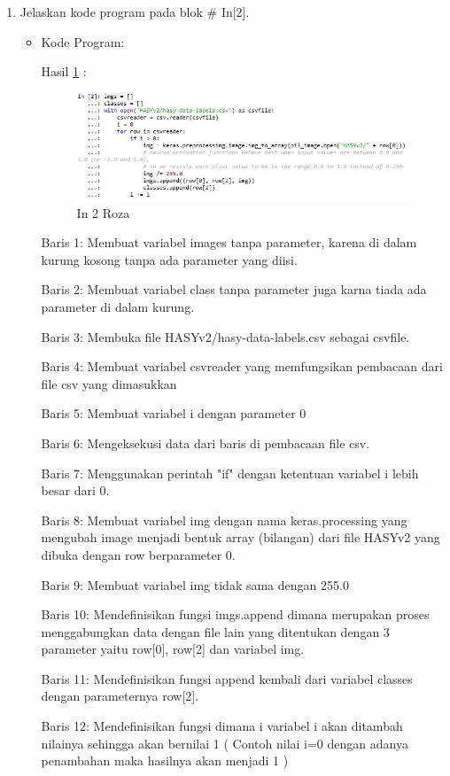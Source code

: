 \begin{enumerate}
\item Jelaskan kode program pada blok \# In[2].
\begin{itemize}
\item Kode Program:

\par Hasil \ref{in2roza} :
\begin{figure}[!hbtp]
\centering
\includegraphics[scale=0.7]{figures/prak2roza.jpg}
\caption{In 2 Roza}
\label{in2roza}
\end{figure}
\par Baris 1: Membuat variabel images tanpa parameter, karena di dalam kurung kosong tanpa ada parameter yang diisi.
\par Baris 2: Membuat variabel class tanpa parameter juga karna tiada ada parameter di dalam kurung.
\par Baris 3: Membuka file HASYv2/hasy-data-labels.csv sebagai csvfile.
\par Baris 4: Membuat variabel csvreader yang memfungsikan pembacaan dari file csv yang dimasukkan
\par Baris 5: Membuat variabel i dengan parameter 0
\par Baris 6: Mengeksekusi data dari baris di pembacaan file csv.
\par Baris 7: Menggunakan perintah "if" dengan ketentuan variabel i lebih besar dari  0.
\par Baris 8: Membuat variabel img dengan nama keras.processing yang mengubah image menjadi bentuk array (bilangan) dari file HASYv2 yang dibuka dengan row berparameter 0.
\par Baris 9: Membuat variabel img tidak sama dengan 255.0
\par Baris 10: Mendefinisikan fungsi imgs.append dimana merupakan proses menggabungkan data dengan file lain  yang ditentukan dengan 3 parameter yaitu row[0], row[2] dan variabel img.
\par Baris 11: Mendefinisikan fungsi append kembali dari variabel classes dengan parameternya row[2].
\par Baris 12: Mendefinisikan fungsi dimana i variabel i akan ditambah nilainya sehingga akan bernilai 1 ( Contoh nilai i=0 dengan adanya penambahan maka hasilnya akan menjadi 1 )
\end{itemize}
\par



\end{enumerate}
